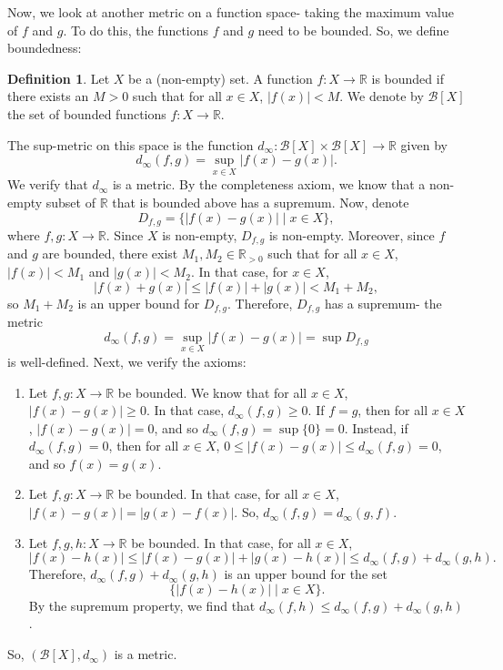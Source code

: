 \documentclass[a4paper, openany]{memoir}
\theoremstyle{definition}
\newtheorem{definition}{Definition}[section]
\theoremstyle{plain}
\begin{document}
Now, we look at another metric on a function space- taking the maximum value of $f$ and $g$. To do this, the functions $f$ and $g$ need to be bounded. So, we define boundedness:
\begin{definition}
Let $X$ be a (non-empty) set. A function $f: X \to \mathbb{R}$ is bounded if there exists an $M > 0$ such that for all $x \in X$, $|f(x)| < M$. We denote by $\mathcal{B}[X]$ the set of bounded functions $f: X \to \mathbb{R}$. 
\end{definition}
The sup-metric on this space is the function $d_\infty: \mathcal{B}[X] \times \mathcal{B}[X] \to \mathbb{R}$ given by
\[d_\infty(f, g) = \sup_{x \in X} |f(x) - g(x)|.\]
We verify that $d_\infty$ is a metric. By the completeness axiom, we know that a non-empty subset of $\mathbb{R}$ that is bounded above has a supremum. Now, denote
\[D_{f, g} = \{|f(x) - g(x)| \mid x \in X\},\]
where $f, g: X \to \mathbb{R}$. Since $X$ is non-empty, $D_{f, g}$ is non-empty. Moreover, since $f$ and $g$ are bounded, there exist $M_1, M_2 \in \mathbb{R}_{> 0}$ such that for all $x \in X$, $|f(x)| < M_1$ and $|g(x)| < M_2$. In that case, for $x \in X$,
\[|f(x) + g(x)| \leqslant |f(x)| + |g(x)| < M_1 + M_2,\]
so $M_1 + M_2$ is an upper bound for $D_{f, g}$. Therefore, $D_{f, g}$ has a supremum- the metric 
\[d_\infty(f, g) = \sup_{x \in X} |f(x) - g(x)| = \sup D_{f, g}\]
is well-defined. Next, we verify the axioms:
\begin{enumerate}[label=\textbf{M\arabic*}.]
    \item Let $f, g: X \to \mathbb{R}$ be bounded. We know that for all $x \in X$, $|f(x) - g(x)| \geqslant 0$. In that case, $d_\infty(f, g) \geqslant 0$. If $f = g$, then for all $x \in X$, $|f(x) - g(x)| = 0$, and so $d_\infty(f, g) = \sup \{0\} = 0$. Instead, if $d_\infty(f, g) = 0$, then for all $x \in X$, $0 \leqslant |f(x) - g(x)| \leqslant d_\infty(f, g) = 0$, and so $f(x) = g(x)$.
    
    \item Let $f, g: X \to \mathbb{R}$ be bounded. In that case, for all $x \in X$, $|f(x) - g(x)| = |g(x) - f(x)|$. So, $d_\infty(f, g) = d_\infty(g, f)$.
    
    \item Let $f, g, h: X \to \mathbb{R}$ be bounded. In that case, for all $x \in X$,
    \[|f(x) - h(x)| \leqslant |f(x) - g(x)| + |g(x) - h(x)| \leqslant d_\infty(f, g) + d_\infty(g, h).\]
    Therefore, $d_\infty(f, g) + d_\infty(g, h)$ is an upper bound for the set
    \[\{|f(x) - h(x)| \mid x \in X\}.\]
    By the supremum property, we find that $d_\infty(f, h) \leqslant d_\infty(f, g) + d_\infty(g, h)$.
\end{enumerate}
So, $(\mathcal{B}[X], d_\infty)$ is a metric.
\end{document}
